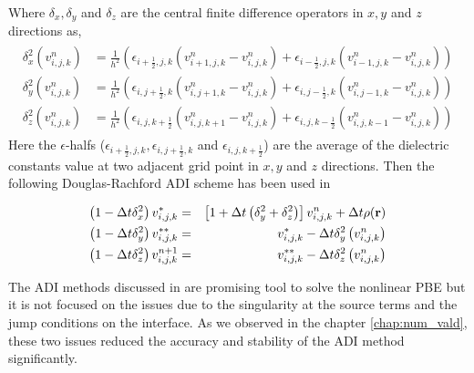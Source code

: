 Where $\delta_x,\delta_y$ and $\delta_z$ are the central finite difference operators in $x,y$ and $z$ directions as, 
  \begin{eqnarray}
 \begin{aligned}
	\delta_x^2\left(v_{i,j,k}^n\right)&= \frac{1}{h^2} \left(\epsilon_{i+\frac{1}{2},j,k}(v_{i+1,j,k}^n-v_{i,j,k}^n)+\epsilon_{i-\frac{1}{2},j,k}(v_{i-1,j,k}^n-v_{i,j,k}^n)\right) \\ \label{dif_opx_adi1}
	\delta_y^2\left(v_{i,j,k}^n\right)&= \frac{1}{h^2} \left(\epsilon_{i,j+\frac{1}{2},k}(v_{i,j+1,k}^n-v_{i,j,k}^n)+\epsilon_{i,j-\frac{1}{2},k}(v_{i,j-1,k}^n-v_{i,j,k}^n)\right) \\ %
	\delta_z^2\left(v_{i,j,k}^n\right)&=\frac{1}{h^2} \left(\epsilon_{i,j,k+\frac{1}{2}}(v_{i,j,k+1}^n-v_{i,j,k}^n)+\epsilon_{i,j,k-\frac{1}{2}}(v_{i,j,k-1}^n-v_{i,j,k}^n)\right)  
	\end{aligned}
\end{eqnarray}
Here the $\epsilon$-halfs ($\epsilon_{i+\frac{1}{2},j,k},\epsilon_{i,j+\frac{1}{2},k}$ and $\epsilon_{i,j,k+\frac{1}{2}}$) are the average of the dielectric constants value at two adjacent grid point in $x,y$ and $z$ directions. Then the following Douglas-Rachford ADI scheme has been used in \cite{geng_fully_2013}
   
\begin{eqnarray}
		\left(1- \Delta t \delta_x^2\right)v_{i,j,k}^{*}&=&\left[1+ \Delta t \left(\delta_y^2+\delta_z^2 \right)\right]v_{i,j,k}^{n}+\Delta t \rho({\bf r})\label{eq_ADI1}\nonumber \\ 
		\left(1-\Delta t \delta_y^2\right)v_{i,j,k}^{**}&=&v_{i,j,k}^{*}- \Delta t \delta_y^2\left(v_{i,j,k}^{n}\right)\label{GFM-ADI2}\\
		\left(1- \Delta t \delta_z^2\right)v_{i,j,k}^{n+1}&=&v_{i,j,k}^{**}- \Delta t \delta_z^2\left(v_{i,j,k}^{n}\right)\label{GFM-ADI3}\nonumber
\end{eqnarray} 

The ADI methods discussed in \cite{geng_fully_2013} are promising tool to solve the nonlinear PBE but it is not focused on the issues due to the singularity at the source terms and the jump conditions on the interface. As we observed in the chapter \ref{chap:num_vald}, these two issues reduced the accuracy and stability of the ADI method significantly.  
       
